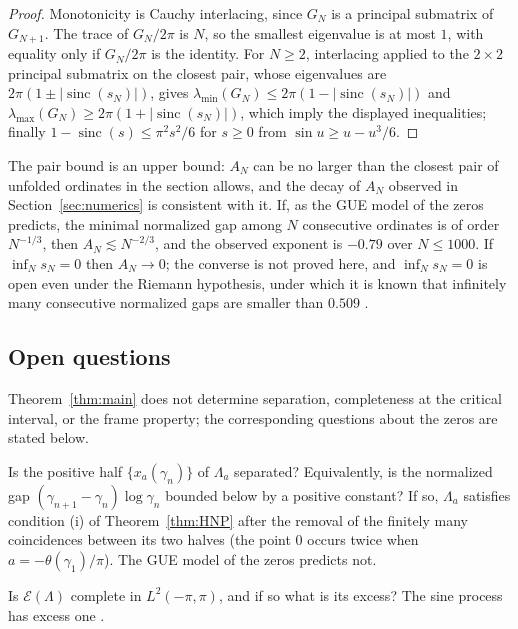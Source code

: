 \documentclass[11pt]{article}
\DeclareMathOperator{\sinc}{sinc}
\newcommand{\Lam}{\Lambda}
\newcommand{\E}{\mathcal{E}}
\begin{document}
\begin{proof}
Monotonicity is Cauchy interlacing, since $G_N$ is a principal submatrix of $G_{N+1}$. The trace of $G_N/2\pi$ is $N$, so the smallest eigenvalue is at most $1$, with equality only if $G_N/2\pi$ is the identity. For $N\ge2$, interlacing applied to the $2\times2$ principal submatrix on the closest pair, whose eigenvalues are $2\pi(1\pm|\sinc(s_N)|)$, gives $\lambda_{\min}(G_N)\le2\pi(1-|\sinc(s_N)|)$ and $\lambda_{\max}(G_N)\ge2\pi(1+|\sinc(s_N)|)$, which imply the displayed inequalities; finally $1-\sinc(s)\le\pi^2s^2/6$ for $s\ge0$ from $\sin u\ge u-u^3/6$.
\end{proof}

The pair bound is an upper bound: $A_N$ can be no larger than the closest pair of unfolded ordinates in the section allows, and the decay of $A_N$ observed in Section~\ref{sec:numerics} is consistent with it. If, as the GUE model of the zeros predicts, the minimal normalized gap among $N$ consecutive ordinates is of order $N^{-1/3}$, then $A_N\lesssim N^{-2/3}$, and the observed exponent is $-0.79$ over $N\le1000$. If $\inf_N s_N=0$ then $A_N\to0$; the converse is not proved here, and $\inf_Ns_N=0$ is open even under the Riemann hypothesis, under which it is known that infinitely many consecutive normalized gaps are smaller than $0.509$ \cite{Inoue26}.

\subsection{Open questions}\label{sec:open}
Theorem~\ref{thm:main} does not determine separation, completeness at the critical interval, or the frame property; the corresponding questions about the zeros are stated below.

\begin{question}
Is the positive half $\{x_a(\gamma_n)\}$ of $\Lam_a$ separated? Equivalently, is the normalized gap $(\gamma_{n+1}-\gamma_n)\log\gamma_n$ bounded below by a positive constant? If so, $\Lam_a$ satisfies condition (i) of Theorem~\ref{thm:HNP} after the removal of the finitely many coincidences between its two halves (the point $0$ occurs twice when $a=-\theta(\gamma_1)/\pi$). The GUE model of the zeros predicts not.
\end{question}

\begin{question}
Is $\E(\Lam)$ complete in $L^2(-\pi,\pi)$, and if so what is its excess? The sine process has excess one \cite{Bufetov}.
\end{question}
\end{document}
